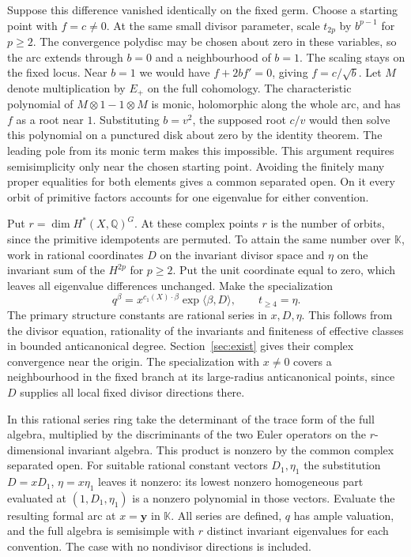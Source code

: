 Suppose this difference vanished identically on the fixed germ. Choose a starting point with $f=c\ne0$. At the same small divisor parameter, scale $t_{2p}$ by $b^{p-1}$ for $p\ge2$. The convergence polydisc may be chosen about zero in these variables, so the arc extends through $b=0$ and a neighbourhood of $b=1$. The scaling stays on the fixed locus. Near $b=1$ we would have $f+2b f'=0$, giving $f=c/\sqrt b$. Let $M$ denote multiplication by $E_+$ on the full cohomology. The characteristic polynomial of $M\otimes 1-1\otimes M$ is monic, holomorphic along the whole arc, and has $f$ as a root near $1$. Substituting $b=v^2$, the supposed root $c/v$ would then solve this polynomial on a punctured disk about zero by the identity theorem. The leading pole from its monic term makes this impossible. This argument requires semisimplicity only near the chosen starting point. Avoiding the finitely many proper equalities for both elements gives a common separated open. On it every orbit of primitive factors accounts for one eigenvalue for either convention.

Put $r=\dim H^*(X,\mathbb Q)^G$. At these complex points $r$ is the number of orbits, since the primitive idempotents are permuted. To attain the same number over $\mathbb K$, work in rational coordinates $D$ on the invariant divisor space and $\eta$ on the invariant sum of the $H^{2p}$ for $p\ge2$. Put the unit coordinate equal to zero, which leaves all eigenvalue differences unchanged. Make the specialization
\[
         q^\beta=x^{c_1(X)\cdot\beta}\exp\langle\beta,D\rangle,
                     \qquad t_{\ge4}=\eta .
\]
The primary structure constants are rational series in $x,D,\eta$. This follows from the divisor equation, rationality of the invariants and finiteness of effective classes in bounded anticanonical degree. Section~\ref{sec:exist} gives their complex convergence near the origin. The specialization with $x\ne0$ covers a neighbourhood in the fixed branch at its large-radius anticanonical points, since $D$ supplies all local fixed divisor directions there.

In this rational series ring take the determinant of the trace form of the full algebra, multiplied by the discriminants of the two Euler operators on the $r$-dimensional invariant algebra. This product is nonzero by the common complex separated open. For suitable rational constant vectors $D_1,\eta_1$ the substitution $D=xD_1$, $\eta=x\eta_1$ leaves it nonzero: its lowest nonzero homogeneous part evaluated at $(1,D_1,\eta_1)$ is a nonzero polynomial in those vectors. Evaluate the resulting formal arc at $x=\mathbf y$ in $\mathbb K$. All series are defined, $q$ has ample valuation, and the full algebra is semisimple with $r$ distinct invariant eigenvalues for each convention. The case with no nondivisor directions is included.

